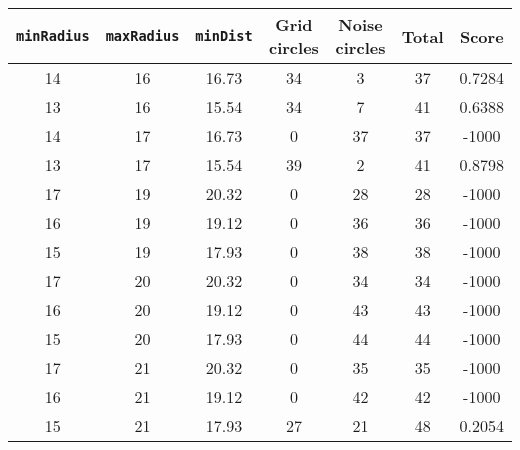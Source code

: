 \documentclass[letterpaper, 12pt]{article}
\begin{document}
\begin{longtable}{|c|c|c|c|c|c|c|}
\hline
\textbf{\texttt{minRadius}} & \textbf{\texttt{maxRadius}} & \textbf{\texttt{minDist}} & \textbf{Grid circles} & \textbf{Noise circles} & \textbf{Total} & \textbf{Score} \\
\hline
14 & 16 & 16.73 & 34 & 3 & 37 & 0.7284 \\
\hline
13 & 16 & 15.54 & 34 & 7 & 41 & 0.6388 \\
\hline
14 & 17 & 16.73 & 0 & 37 & 37 & -1000 \\
\hline
13 & 17 & 15.54 & 39 & 2 & 41 & 0.8798 \\
\hline
17 & 19 & 20.32 & 0 & 28 & 28 & -1000 \\
\hline
16 & 19 & 19.12 & 0 & 36 & 36 & -1000 \\
\hline
15 & 19 & 17.93 & 0 & 38 & 38 & -1000 \\
\hline
17 & 20 & 20.32 & 0 & 34 & 34 & -1000 \\
\hline
16 & 20 & 19.12 & 0 & 43 & 43 & -1000 \\
\hline
15 & 20 & 17.93 & 0 & 44 & 44 & -1000 \\
\hline
17 & 21 & 20.32 & 0 & 35 & 35 & -1000 \\
\hline
16 & 21 & 19.12 & 0 & 42 & 42 & -1000 \\
\hline
15 & 21 & 17.93 & 27 & 21 & 48 & 0.2054 \\
\hline
\end{longtable}
\end{document}
